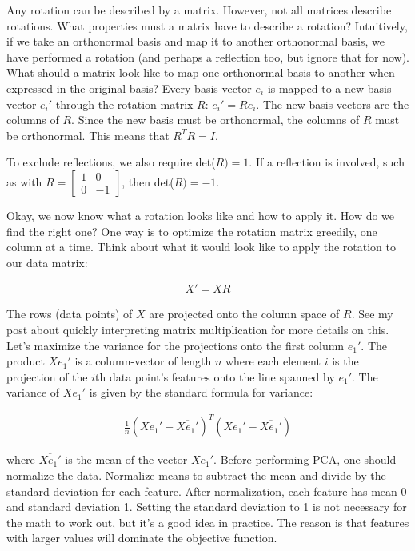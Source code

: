 \documentclass[12pt]{article}  %
\begin{document}
Any rotation can be described by a matrix. However, not all matrices describe rotations. What properties must a matrix have to describe a rotation? Intuitively, if we take an orthonormal basis and map it to another orthonormal basis, we have performed a rotation (and perhaps a reflection too, but ignore that for now). What should a matrix look like to map one orthonormal basis to another when expressed in the original basis? Every basis vector $e_i$ is mapped to a new basis vector $e_i'$ through the rotation matrix $R$: $e_i' = Re_i$. The new basis vectors are the columns of $R$. Since the new basis must be orthonormal, the columns of $R$ must be orthonormal. This means that $R^TR = I$.

To exclude reflections, we also require det($R) = 1$. If a reflection is involved, such as with $R = \begin{bmatrix} 1 & 0 \\ 0 & -1 \end{bmatrix}$, then det($R) = -1$.

Okay, we now know what a rotation looks like and how to apply it. How do we find the right one? One way is to optimize the rotation matrix greedily, one column at a time. Think about what it would look like to apply the rotation to our data matrix:

\begin{align*}
    X' = XR
\end{align*}

The rows (data points) of $X$ are projected onto the column space of $R$. See my post about quickly interpreting matrix multiplication for more details on this. Let's maximize the variance for the projections onto the first column $e_1'$. The product $Xe_1'$ is a column-vector of length $n$ where each element $i$ is the projection of the $i$th data point's features onto the line spanned by $e_1'$. The variance of $Xe_1'$ is given by the standard formula for variance:

\begin{align*}
    \frac{1}{n} (Xe_1' - \overline{Xe_1'})^T(Xe_1' - \overline{Xe_1'})
\end{align*}

where $\overline{Xe_1'}$ is the mean of the vector $Xe_1'$. Before performing PCA, one should normalize the data. Normalize means to subtract the mean and divide by the standard deviation for each feature. After normalization, each feature has mean 0 and standard deviation 1. Setting the standard deviation to 1 is not necessary for the math to work out, but it's a good idea in practice. The reason is that features with larger values will dominate the objective function.
\end{document}
